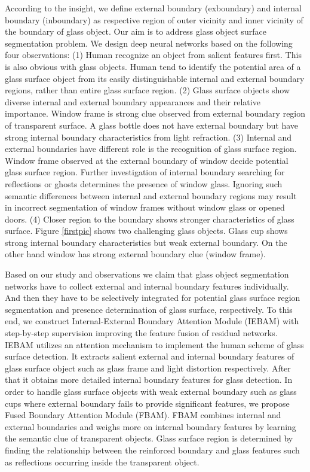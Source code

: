\documentclass[10pt,twocolumn,letterpaper]{article}
\begin{document}
According to the insight, we define external boundary (exboundary) and internal boundary (inboundary) as respective region of outer vicinity and inner vicinity of the boundary of glass object. Our aim is to address glass object surface segmentation problem. We design deep neural networks based on the following four observations: (1) Human recognize an object from salient features first. This is also obvious with glass objects. Human tend to identify the potential area of a glass surface object from its easily distinguishable internal and external boundary regions, rather than entire glass surface region. (2) Glass surface objects show diverse internal and external boundary appearances and their relative importance. Window frame is strong clue observed from external boundary region of transparent surface. A glass bottle does not have external boundary but have strong internal boundary characteristics from light refraction. (3) Internal and external boundaries have different role is the recognition of glass surface region. Window frame observed at the external boundary of window decide potential glass surface region. Further investigation of internal boundary searching for reflections or ghosts determines the presence of window glass. Ignoring such semantic differences between internal and external boundary regions may result in incorrect segmentation of window frames without window glass or opened doors. (4) Closer region to the boundary shows stronger characteristics of glass surface. Figure \ref{firstpic} shows two challenging glass objects. Glass cup shows strong internal boundary characteristics but weak external boundary. On the other hand window has strong external boundary clue (window frame).

Based on our study and observations we claim that glass object segmentation networks have to collect external and internal boundary features individually. And then they have to be selectively integrated for potential glass surface region segmentation and presence determination of glass surface, respectively. To this end, we construct Internal-External Boundary Attention Module (IEBAM) with step-by-step supervision improving the feature fusion of residual networks\cite{he2016deep}.
IEBAM utilizes an attention mechanism to implement the human scheme of glass surface detection. It extracts salient external and internal boundary features of glass surface object such as glass frame and light distortion respectively. 
After that it obtains more detailed internal boundary features for glass detection. In order to handle glass surface objects with weak external boundary such as glass cups where external boundary fails to provide significant features, we propose Fused Boundary Attention Module (FBAM). FBAM combines internal and external boundaries and weighs more on internal boundary features by learning the semantic clue of transparent objects. Glass surface region is determined by finding the relationship between the reinforced boundary and glass features such as reflections occurring inside the transparent object. 
\end{document}
